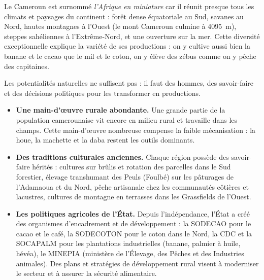 \documentclass[11pt]{article}
\newcounter{popsec}
\newcounter{popsub}
\newcommand{\courssub}[1]{%
  \stepcounter{popsub}%
  \par\vspace{9pt}\noindent{\popxbold\fontsize{11.5}{13}\selectfont\color{popink}{\color{poporange}\thepopsec.\thepopsub}\hspace{6pt}#1}\par\nopagebreak\vspace{4pt}
}
\begin{document}
\begin{savaistu}
Le Cameroun est surnommé \emph{l'Afrique en miniature} car il réunit presque tous les climats et paysages du continent : forêt dense équatoriale au Sud, savanes au Nord, hautes montagnes à l'Ouest (le mont Cameroun culmine à \SI{4095}{m}), steppes sahéliennes à l'Extrême-Nord, et une ouverture sur la mer. Cette diversité exceptionnelle explique la variété de ses productions : on y cultive aussi bien la banane et le cacao que le mil et le coton, on y élève des zébus comme on y pêche des capitaines.
\end{savaistu}

\courssub{Les conditions humaines}

Les potentialités naturelles ne suffisent pas : il faut des hommes, des savoir-faire et des décisions politiques pour les transformer en productions.

\begin{itemize}
\item \textbf{Une main-d'œuvre rurale abondante.} Une grande partie de la population camerounaise vit encore en milieu rural et travaille dans les champs. Cette main-d'œuvre nombreuse compense la faible mécanisation : la houe, la machette et la daba restent les outils dominants.
\item \textbf{Des traditions culturales anciennes.} Chaque région possède des savoir-faire hérités : cultures sur brûlis et rotation des parcelles dans le Sud forestier, élevage transhumant des Peuls (Foulbé) sur les pâturages de l'Adamaoua et du Nord, pêche artisanale chez les communautés côtières et lacustres, cultures de montagne en terrasses dans les Grassfields de l'Ouest.
\item \textbf{Les politiques agricoles de l'État.} Depuis l'indépendance, l'État a créé des organismes d'encadrement et de développement : la SODECAO pour le cacao et le café, la SODECOTON pour le coton dans le Nord, la CDC et la SOCAPALM pour les plantations industrielles (banane, palmier à huile, hévéa), le MINEPIA (ministère de l'Élevage, des Pêches et des Industries animales). Des plans et stratégies de développement rural visent à moderniser le secteur et à assurer la sécurité alimentaire.
\end{itemize}
\end{document}
